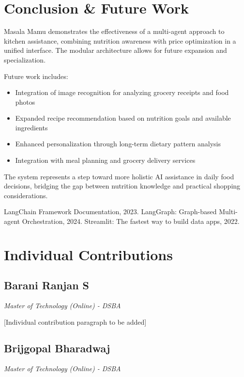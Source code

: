 \documentclass{ecai}
\begin{document}
\section{Conclusion \& Future Work}

Masala Mamu demonstrates the effectiveness of a multi-agent approach to kitchen assistance, combining nutrition awareness with price optimization in a unified interface. The modular architecture allows for future expansion and specialization.

Future work includes:
\begin{itemize}[noitemsep,topsep=0pt]
    \item Integration of image recognition for analyzing grocery receipts and food photos
    \item Expanded recipe recommendation based on nutrition goals and available ingredients
    \item Enhanced personalization through long-term dietary pattern analysis
    \item Integration with meal planning and grocery delivery services
\end{itemize}

The system represents a step toward more holistic AI assistance in daily food decisions, bridging the gap between nutrition knowledge and practical shopping considerations.


\begin{thebibliography}{9}
 LangChain Framework Documentation, 2023.
 LangGraph: Graph-based Multi-agent Orchestration, 2024.
 Streamlit: The fastest way to build data apps, 2022.
\end{thebibliography}

\clearpage
\section*{Individual Contributions}

\subsection*{Barani Ranjan S}
\textit{Master of Technology (Online) - DSBA}

[Individual contribution paragraph to be added]

\subsection*{Brijgopal Bharadwaj}
\textit{Master of Technology (Online) - DSBA}
\end{document}
